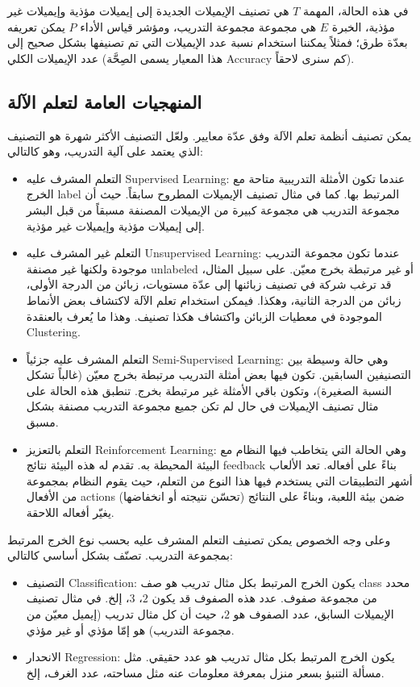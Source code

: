 في هذه الحالة، المهمة $T$ هي تصنيف الإيميلات الجديدة إلى إيميلات مؤذية وإيميلات غير مؤذية، الخبرة $E$ هي مجموعة مجموعة التدريب،
ومؤشر قياس الأداء $P$ يمكن تعريفه بعدّة طرق؛ فمثلاً يمكننا استخدام نسبة عدد الإيميلات التي تم تصنيفها بشكل صحيح إلى عدد الإيميلات الكلي
(هذا المعيار يسمى الصِحَّة \textenglish{Accuracy} كم سنرى لاحقاً).

\subsection{المنهجيات العامة لتعلم الآلة}
\label{sec:ml:classification}
يمكن تصنيف أنظمة تعلم الآلة وفق عدّة معايير.
ولعّل التصنيف الأكثر شهرة هو التصنيف الذي يعتمد على آلية التدريب، وهو كالتالي:
\begin{itemize}
	\item
	التعلم المشرف عليه \textenglish{Supervised Learning}:
	عندما تكون الأمثلة التدريبية متاحة مع الخرج \textenglish{label} المرتبط بها. كما في مثال تصنيف الإيميلات المطروح سابقاً.
	حيث أن مجموعة التدريب هي مجموعة كبيرة من الإيميلات المصنفة مسبقاً من قبل البشر إلى إيميلات مؤذية وإيميلات غير مؤذية.
	\item
	التعلم غير المشرف عليه \textenglish{Unsupervised Learning}:
	عندما تكون مجموعة التدريب موجودة ولكنها غير مصنفة \textenglish{unlabeled} أو غير مرتبطة بخرج معيّن.
	على سبيل المثال، قد ترغب شركة في تصنيف زبائنها إلى عدّة مستويات، زبائن من الدرجة الأولى، زبائن من الدرجة الثانية، وهكذا.
	فيمكن استخدام تعلم الآلة لاكتشاف بعض الأنماط الموجودة في معطيات الزبائن واكتشاف هكذا تصنيف.
	وهذا ما يُعرف بالعنقدة \textenglish{Clustering}.
	\item
	التعلم المشرف عليه جزئياً \textenglish{Semi-Supervised Learning}:
	وهي حالة وسيطة بين التصنيفين السابقين. تكون فيها بعض أمثلة التدريب مرتبطة بخرج معيّن (غالباً تشكل النسبة الصغيرة)،
	وتكون باقي الأمثلة غير مرتبطة بخرج. تنطبق هذه الحالة على مثال تصنيف الإيميلات في حال لم تكن جميع مجموعة التدريب مصنفة بشكل مسبق.
	\item 
	التعلم بالتعزيز \textenglish{Reinforcement Learning}:
	وهي الحالة التي يتخاطب فيها النظام مع البيئة المحيطة به.
	تقدم له هذه البيئة نتائج \textenglish{feedback} بناءً على أفعاله.
	تعد الألعاب أشهر التطبيقات التي يستخدم فيها هذا النوع من التعلم،
	حيث يقوم النظام بمجموعة من الأفعال \textenglish{actions} ضمن بيئة اللعبة،
	وبناءً على النتائج (تحسّن نتيجته أو انخفاضها) يغيّر أفعاله اللاحقة.
\end{itemize}

وعلى وجه الخصوص يمكن تصنيف التعلم المشرف عليه بحسب نوع الخرج المرتبط بمجموعة التدريب.
تصنّف بشكل أساسي كالتالي:
\begin{itemize}
	\item 
	التصنيف \textenglish{Classification}:
	يكون الخرج المرتبط بكل مثال تدريب هو صف \textenglish{class} محدد من مجموعة صفوف.
	عدد هذه الصفوف قد يكون $2$، $3$، إلخ.
	في مثال تصنيف الإيميلات السابق، عدد الصفوف هو $2$، حيث أن كل مثال تدريب (إيميل معيّن من مجموعة التدريب) هو إمّا مؤذي أو غير مؤذي.
	\item 
	الانحدار \textenglish{Regression}:
	يكون الخرج المرتبط بكل مثال تدريب هو عدد حقيقي. مثل مسألة التنبؤ بسعر منزل بمعرفة معلومات عنه مثل مساحته، عدد الغرف، إلخ.
\end{itemize}







